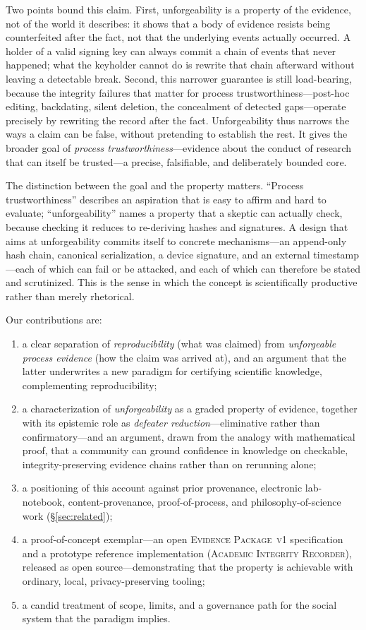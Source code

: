 \documentclass[11pt]{article}
\newcommand{\pkg}{\textsc}
\newcommand{\air}{\pkg{Academic Integrity Recorder}\xspace}
\newcommand{\evpkg}{\textsc{Evidence Package~v1}\xspace}
\begin{document}
Two points bound this claim. First, unforgeability is a property of the evidence, not
of the world it describes: it shows that a body of evidence resists being counterfeited
after the fact, not that the underlying events actually occurred. A holder of a valid
signing key can always commit a chain of events that never happened; what the keyholder
cannot do is rewrite that chain afterward without leaving a detectable break. Second,
this narrower guarantee is still load-bearing, because the integrity failures that
matter for process trustworthiness---post-hoc editing, backdating, silent deletion, the
concealment of detected gaps---operate precisely by rewriting the record after the fact.
Unforgeability thus narrows the ways a claim can be false, without pretending to
establish the rest. It gives the broader goal of \emph{process trustworthiness}---evidence
about the conduct of research that can itself be trusted---a precise, falsifiable, and
deliberately bounded core.

The distinction between the goal and the property matters. ``Process trustworthiness''
describes an aspiration that is easy to affirm and hard to evaluate; ``unforgeability''
names a property that a skeptic can actually check, because checking it reduces to
re-deriving hashes and signatures. A design that aims at unforgeability commits itself
to concrete mechanisms---an append-only hash chain, canonical serialization, a device
signature, and an external timestamp---each of which can fail or be attacked, and each of
which can therefore be stated and scrutinized. This is the sense in which the concept is
scientifically productive rather than merely rhetorical.

Our contributions are:
\begin{enumerate}
  \item a clear separation of \emph{reproducibility} (what was claimed) from
        \emph{unforgeable process evidence} (how the claim was arrived at), and an
        argument that the latter underwrites a new paradigm for certifying scientific
        knowledge, complementing reproducibility;
  \item a characterization of \emph{unforgeability} as a graded property of evidence,
        together with its epistemic role as \emph{defeater reduction}---eliminative
        rather than confirmatory---and an argument, drawn from the analogy with
        mathematical proof, that a community can ground confidence in knowledge on
        checkable, integrity-preserving evidence chains rather than on rerunning alone;
  \item a positioning of this account against prior provenance, electronic
        lab-notebook, content-provenance, proof-of-process, and philosophy-of-science
        work (\S\ref{sec:related});
  \item a proof-of-concept exemplar---an open \evpkg specification and a prototype
        reference implementation (\air), released as open source---demonstrating that
        the property is achievable with ordinary, local, privacy-preserving tooling;
  \item a candid treatment of scope, limits, and a governance path for the social
        system that the paradigm implies.
\end{enumerate}
\end{document}

